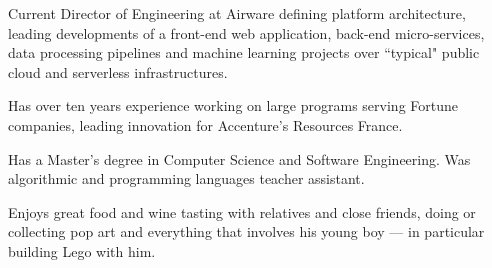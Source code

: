 
\begin{cvparagraph}

Current Director of Engineering at Airware defining platform architecture, leading developments of a front-end web application, back-end micro-services, data processing pipelines and machine learning projects over ``typical" public cloud and serverless infrastructures.

Has over ten years experience working on large programs serving Fortune companies, leading innovation for Accenture’s Resources France.

Has a Master’s degree in Computer Science and Software Engineering. Was algorithmic and programming languages teacher assistant.

Enjoys great food and wine tasting with relatives and close friends, doing or collecting pop art and everything that involves his young boy --- in particular building Lego with him.
\end{cvparagraph}


